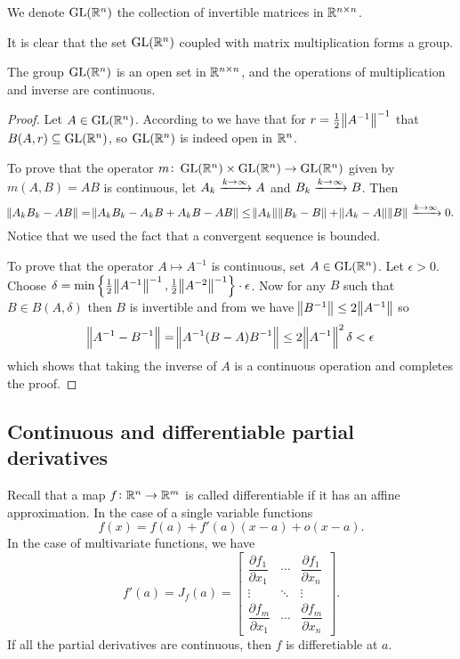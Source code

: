 \documentclass[11pt,a4paper]{article}
\begin{document}
\begin{definition}
  We denote $\operatorname{GL}(\mathbb{R}^n)$ the collection of invertible matrices in 
  $\mathbb{R}^{n \times n}$.
\end{definition}
\begin{remark}
  It is clear that the set $\operatorname{GL}(\mathbb{R}^n)$ coupled with matrix multiplication
  forms a group.
\end{remark}

\begin{proposition}
  The group $\operatorname{GL}(\mathbb{R}^n)$ is an open set in $\mathbb{R}^{n \times n}$, and the operations
  of multiplication and inverse are continuous.
\end{proposition}
\begin{proof}
  Let $A \in \operatorname{GL}(\mathbb{R}^n)$.
  According to  we have that for 
  $r = \frac{1}{2} \norm{A^{-1}}^{-1}$ that $B(A,r) \subseteq \operatorname{GL}(\mathbb{R}^n)$,
  so $\operatorname{GL}(\mathbb{R}^n)$ is indeed open in $\mathbb{R}^n$.

  To prove that the operator $m \colon \operatorname{GL}(\mathbb{R}^n) \times \operatorname{GL}(\mathbb{R}^n) \to \operatorname{GL}(\mathbb{R}^n)$
  given by $m(A,B) = AB$ is continuous, let $A_k \xrightarrow{k \to \infty} A$
  and $B_k \xrightarrow{k \to \infty} B$. Then
  \[
    \norm{A_k B_k - A B} =
    \norm{A_k B_k - A_k B + A_k B - A B} \le
    \norm{A_k} \norm{B_k - B} + \norm{A_k - A} \norm{B} \xrightarrow{k \to \infty}
    0.
  \]
  Notice that we used the fact that a convergent sequence is bounded.

  To prove that the operator $A \mapsto A^{-1}$ is continuous, set 
  $A \in \operatorname{GL}(\mathbb{R}^n)$.
  Let $\epsilon > 0$.
  Choose
  $\delta = \min\set{\frac{1}{2}\norm{A^{-1}}^{-1},\frac{1}{2}\norm{A^{-2}}^{-1}} 
  \cdot \epsilon$.
  Now for any $B$ such that $B \in B(A,\delta)$ then $B$ is invertible
  and from  we have 
  $\norm{B^{-1}} \le 2 \norm{A^{-1}}$ so
  \[
    \norm{A^{-1} - B^{-1}} =
    \norm{A^{-1} (B - A) B^{-1}} \le
    2 \norm{A^{-1}}^2 \delta < \epsilon
  \]
  which shows that taking the inverse of $A$ is a continuous operation and
  completes the proof.
\end{proof}

\subsection{Continuous and differentiable partial derivatives}
Recall that a map $f \colon \mathbb{R}^n \to \mathbb{R}^m$ is called differentiable if
it has an affine approximation.
In the case of a single variable functions
\[
  f(x) = f(a) + f'(a)(x - a) + o(x - a).
\]
In the case of multivariate functions, we have
\[
  f'(a) = J_f(a) = {\begin{bmatrix}
    {\dfrac {\partial f_{1}}{\partial x_{1}}}&\cdots &{\dfrac {\partial 
    f_{1}}{\partial x_{n}}}\\\vdots &\ddots &\vdots \\{\dfrac {\partial 
    f_{m}}{\partial x_{1}}}&\cdots &{\dfrac {\partial f_{m}}{\partial 
    x_{n}}}\end{bmatrix}}.
\]
If all the partial derivatives are continuous, then $f$ is differetiable at
$a$.
\end{document}
